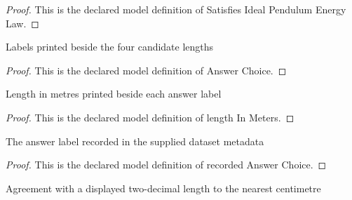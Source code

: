 \begin{proof}
  This is the declared model definition of Satisfies Ideal Pendulum Energy Law.
\end{proof}
\begin{definition}
  \label{def:physics:phyx-mini-0274:phyxminiproblems-problemphyxmini0274-answerchoice}
  Labels printed beside the four candidate lengths
\end{definition}
\begin{proof}
  This is the declared model definition of Answer Choice.
\end{proof}
\begin{definition}
  \label{def:physics:phyx-mini-0274:phyxminiproblems-problemphyxmini0274-answerchoice-lengthinmeters}
  Length in metres printed beside each answer label
\end{definition}
\begin{proof}
  This is the declared model definition of length In Meters.
\end{proof}
\begin{definition}
  \label{def:physics:phyx-mini-0274:phyxminiproblems-problemphyxmini0274-recordedanswerchoice}
  The answer label recorded in the supplied dataset metadata
\end{definition}
\begin{proof}
  This is the declared model definition of recorded Answer Choice.
\end{proof}
\begin{definition}
  \label{def:physics:phyx-mini-0274:phyxminiproblems-problemphyxmini0274-matchesdisplayedlength}
  Agreement with a displayed two-decimal length to the nearest centimetre
\end{definition}
